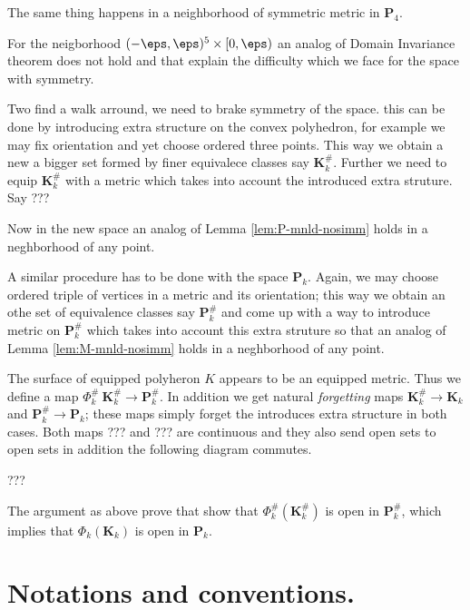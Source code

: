 The same thing happens in a neighborhood of symmetric metric in  $\mathbf{P}_4$.

For the neigborhood $(-\eps,\eps)^5\times [0,\eps)$ an analog of Domain Invariance theorem does not hold and that explain the difficulty which we face for the space with symmetry.

Two find a walk arround, we need to brake symmetry of the space.
this can be done by introducing extra structure on the convex polyhedron,
for example we may fix orientation and yet choose ordered three points.
This way we obtain a new a bigger set formed by finer equivalece classes say $\mathbf{K}_k^\#$.
Further we need to equip $\mathbf{K}_k^\#$ with a metric which takes into account the introduced extra struture.
Say ???

Now in  the new space an analog of Lemma \ref{lem:P-mnld-nosimm} holds in a neghborhood of any point.

A similar procedure has to be done with the space $\mathbf{P}_k$.
Again, we may choose ordered triple of vertices in a metric and its orientation;
this way we obtain an othe set of equivalence classes say $\mathbf{P}_k^\#$
and come up with a way to introduce metric on $\mathbf{P}_k^\#$ which takes into account this extra struture so that an analog of Lemma \ref{lem:M-mnld-nosimm} holds in a neghborhood of any point.

The surface of equipped polyheron $K$ appears to be an equipped metric.
Thus we define a map $\Phi_k^\#\:\mathbf{K}_k^\#\to \mathbf{P}_k^\#$.
In addition we get natural \emph{forgetting} maps $\mathbf{K}_k^\#\to\mathbf{K}_k$ and  $\mathbf{P}_k^\#\to\mathbf{P}_k$;
these maps simply forget the introduces extra structure in both cases.
Both maps ??? and ??? are continuous and they also send open sets to open sets
in addition the following diagram commutes.

???

The argument as above prove that show that $\Phi_k^\#(\mathbf{K}_k^\#)$ is open in $\mathbf{P}_k^\#$, which implies that $\Phi_k(\mathbf{K}_k)$ is open in $\mathbf{P}_k$.

 












\section{Notations and conventions.}





